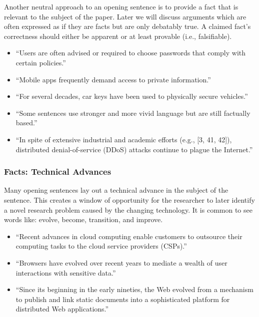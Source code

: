 \documentclass[sigconf,anonymous]{acmart}
\begin{document}
	Another neutral approach to an opening sentence is to provide a fact that is relevant to the subject of the paper. Later we will discuss arguments which are often expressed as if they are facts but are only debatably true. A claimed fact’s correctness should either be apparent or at least provable (i.e., falsifiable). 
	\begin{itemize}	
		\item	``Users are often advised or required to choose passwords that comply with certain policies.''
		
		\item	``Mobile apps frequently demand access to private information.''
		
		\item	``For several decades, car keys have been used to physically secure vehicles.''
		
		\item	``Some sentences use stronger and more vivid language but are still factually based.'' 
		
		\item	``In spite of extensive industrial and academic efforts (e.g., [3, 41, 42]), distributed denial-of-service (DDoS) attacks continue to plague the Internet.''
	\end{itemize} 		
	\subsubsection{Facts: Technical Advances}
	
	Many opening sentences lay out a technical advance in the subject of the sentence. This creates a window of opportunity for the researcher to later identify a novel research problem caused by the changing technology.  It is common to see words like: evolve, become, transition, and improve.
	\begin{itemize}		
		\item	``Recent advances in cloud computing enable customers to outsource their computing tasks to the cloud service providers (CSPs).''
		
		\item	``Browsers have evolved over recent years to mediate a wealth of user interactions with sensitive data.''
		
		\item	``Since its beginning in the early nineties, the Web evolved from a mechanism to publish and link static documents into a sophisticated platform for distributed Web applications.''
	\end{itemize} 		
\end{document}
